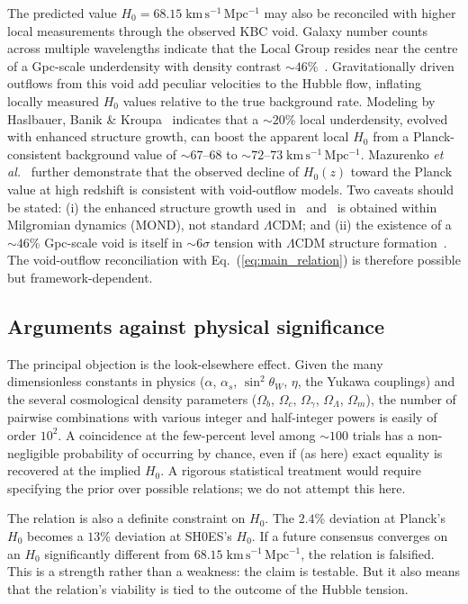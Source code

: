 \documentclass[12pt, a4paper]{article}
\begin{document}
The predicted value $H_0 = 68.15\;\mathrm{km\,s^{-1}\,Mpc^{-1}}$ may also be reconciled with higher local measurements through the observed KBC void. Galaxy number counts across multiple wavelengths indicate that the Local Group resides near the centre of a Gpc-scale underdensity with density contrast $\sim 46\%$~\cite{keenan_2013, whitbourn_2016}. Gravitationally driven outflows from this void add peculiar velocities to the Hubble flow, inflating locally measured $H_0$ values relative to the true background rate. Modeling by Haslbauer, Banik \& Kroupa~\cite{haslbauer_2020} indicates that a $\sim 20$\% local underdensity, evolved with enhanced structure growth, can boost the apparent local $H_0$ from a Planck-consistent background value of $\sim 67$--$68$ to $\sim 72$--$73\;\mathrm{km\,s^{-1}\,Mpc^{-1}}$. Mazurenko \emph{et al.}~\cite{mazurenko_2025} further demonstrate that the observed decline of $H_0(z)$ toward the Planck value at high redshift is consistent with void-outflow models. Two caveats should be stated: (i) the enhanced structure growth used in~\cite{haslbauer_2020} and~\cite{mazurenko_2025} is obtained within Milgromian dynamics (MOND), not standard $\Lambda$CDM; and (ii) the existence of a $\sim 46$\% Gpc-scale void is itself in $\sim 6\sigma$ tension with $\Lambda$CDM structure formation~\cite{haslbauer_2020}. The void-outflow reconciliation with Eq.~(\ref{eq:main_relation}) is therefore possible but framework-dependent.


\subsection{Arguments against physical significance}
\label{sec:arguments_against}

The principal objection is the look-elsewhere effect. Given the many dimensionless constants in physics ($\alpha$, $\alpha_s$, $\sin^2\theta_W$, $\eta$, the Yukawa couplings) and the several cosmological density parameters ($\Omega_b$, $\Omega_c$, $\Omega_\gamma$, $\Omega_\Lambda$, $\Omega_m$), the number of pairwise combinations with various integer and half-integer powers is easily of order $10^2$. A coincidence at the few-percent level among $\sim 100$ trials has a non-negligible probability of occurring by chance, even if (as here) exact equality is recovered at the implied $H_0$. A rigorous statistical treatment would require specifying the prior over possible relations; we do not attempt this here.

The relation is also a definite constraint on $H_0$. The $2.4$\% deviation at Planck's $H_0$ becomes a $13$\% deviation at SH0ES's $H_0$. If a future consensus converges on an $H_0$ significantly different from $68.15\;\mathrm{km\,s^{-1}\,Mpc^{-1}}$, the relation is falsified. This is a strength rather than a weakness: the claim is testable. But it also means that the relation's viability is tied to the outcome of the Hubble tension.
\end{document}
